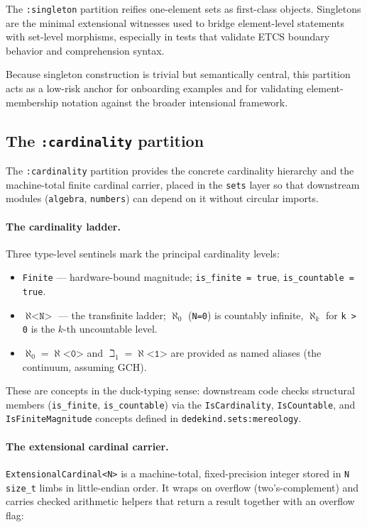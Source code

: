 \documentclass[11pt, a4paper]{report}
\begin{document}
The \texttt{:singleton} partition reifies one-element sets as first-class objects. Singletons are the minimal extensional witnesses used to bridge element-level statements with set-level morphisms, especially in tests that validate ETCS boundary behavior and comprehension syntax.

Because singleton construction is trivial but semantically central, this partition acts as a low-risk anchor for onboarding examples and for validating element-membership notation against the broader intensional framework.

\subsection{The \texttt{:cardinality} partition}
\label{sec:sets-cardinality}

The \texttt{:cardinality} partition provides the concrete cardinality hierarchy and the machine-total finite cardinal carrier, placed in the \texttt{sets} layer so that downstream modules (\texttt{algebra}, \texttt{numbers}) can depend on it without circular imports.

\paragraph{The cardinality ladder.}
Three type-level sentinels mark the principal cardinality levels:
\begin{itemize}
  \item \texttt{Finite} --- hardware-bound magnitude; \texttt{is\_finite = true}, \texttt{is\_countable = true}.
  \item $\aleph\texttt{<N>}$ --- the transfinite ladder; $\aleph_0$ (\texttt{N=0}) is countably infinite, $\aleph_k$ for \texttt{k > 0} is the $k$-th uncountable level.
  \item $\aleph_0 = \aleph\texttt{<0>}$ and $\beth_1 = \aleph\texttt{<1>}$ are provided as named aliases (the continuum, assuming GCH).
\end{itemize}
These are concepts in the duck-typing sense: downstream code checks structural members (\texttt{is\_finite}, \texttt{is\_countable}) via the \texttt{IsCardinality}, \texttt{IsCountable}, and \texttt{IsFiniteMagnitude} concepts defined in \texttt{dedekind.sets:mereology}.

\paragraph{The extensional cardinal carrier.}
\texttt{ExtensionalCardinal<N>} is a machine-total, fixed-precision integer stored in \texttt{N} \texttt{size\_t} limbs in little-endian order. It wraps on overflow (two's-complement) and carries checked arithmetic helpers that return a result together with an overflow flag:
\end{document}
